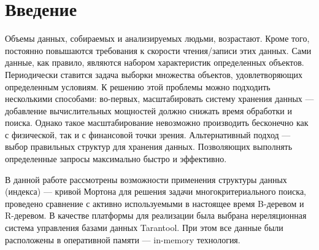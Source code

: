 \chapter*{Введение}							%

\newcommand{\actuality}{}
\newcommand{\progress}{}
\newcommand{\aim}{{\textbf\aimTXT}}
\newcommand{\tasks}{\textbf{\tasksTXT}}
\newcommand{\novelty}{\textbf{\noveltyTXT}}
\newcommand{\influence}{\textbf{\influenceTXT}}
\newcommand{\methods}{\textbf{\methodsTXT}}
\newcommand{\defpositions}{\textbf{\defpositionsTXT}}
\newcommand{\reliability}{\textbf{\reliabilityTXT}}
\newcommand{\probation}{\textbf{\probationTXT}}
\newcommand{\contribution}{\textbf{\contributionTXT}}
\newcommand{\publications}{\textbf{\publicationsTXT}}


%

Объемы данных, собираемых и анализируемых людьми, возрастают.
Кроме того, постоянно повышаются требования к скорости чтения/записи этих данных.
Сами данные, как правило, являются набором характеристик
определенных объектов.
Периодически ставится задача выборки множества объектов,
удовлетворяющих определенным условиям.
К решению этой проблемы можно подходить несколькими способами: во-первых,
масштабировать систему хранения данных --- добавление вычислительных
мощностей должно снижать время обработки и поиска.
Однако такое масштабирование невозможно производить бесконечно как с физической, так и с финансовой точки зрения.
Альтернативный подход --- выбор правильных структур для
хранения данных.
Позволяющих выполнять определенные запросы
максимально быстро и эффективно.

В данной работе рассмотрены возможности применения
структуры данных (индекса) --- кривой Мортона
для решения задачи многокритериального поиска,
проведено сравнение с активно используемыми в настоящее время
B-деревом и R-деревом.
В качестве платформы для реализации была выбрана
нереляционная система управления базами данных Tarantool.
При этом все данные были расположены в оперативной памяти --- in-memory технология.
